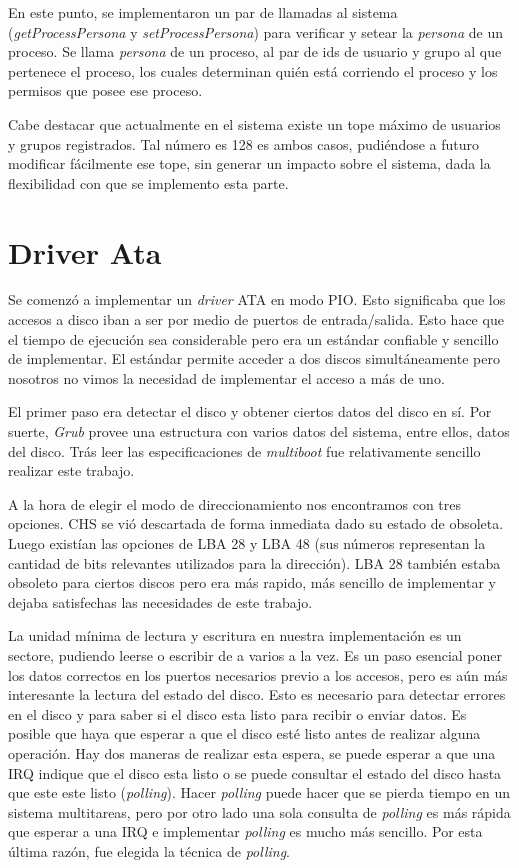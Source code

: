 \documentclass[a4paper,10pt]{article}
\begin{document}
En este punto, se implementaron un par de llamadas al sistema (\textit{getProcessPersona} y \textit{setProcessPersona}) para verificar y setear la \textit{persona}
de un proceso. Se llama \textit{persona} de un proceso, al par de ids de usuario y grupo al que pertenece el proceso, los cuales determinan quién está corriendo
el proceso y los permisos que posee ese proceso.

Cabe destacar que actualmente en el sistema existe un tope máximo de usuarios y grupos registrados. Tal número es 128 es ambos casos, pudiéndose a futuro modificar
fácilmente ese tope, sin generar un impacto sobre el sistema, dada la flexibilidad con que se implemento esta parte.

\newpage
\section{Driver Ata}
    Se comenzó a implementar un \textit{driver} ATA en modo PIO. Esto significaba que los accesos a disco iban a ser
    por medio de puertos de entrada/salida. Esto hace que el tiempo de ejecución sea considerable pero era un estándar
    confiable y sencillo de implementar.
    El estándar permite acceder a dos discos simultáneamente pero nosotros no vimos la necesidad de implementar el 
    acceso a más de uno.
    
    El primer paso era detectar el disco y obtener ciertos datos del disco en sí. Por suerte, \textit{Grub} provee una estructura
    con varios datos del sistema, entre ellos, datos del disco. Trás leer las especificaciones de \textit{multiboot}
    fue relativamente sencillo realizar este trabajo.

    A la hora de elegir el modo de direccionamiento nos encontramos con tres opciones. CHS se vió descartada de forma
    inmediata dado su estado de obsoleta. Luego existían las opciones de LBA 28 y LBA 48 (sus números representan
    la cantidad de bits relevantes utilizados para la dirección). LBA 28 también estaba obsoleto para ciertos discos
    pero era más rapido, más sencillo de implementar y dejaba satisfechas las necesidades de este trabajo.

    La unidad mínima de lectura y escritura en nuestra implementación es un sectore, pudiendo leerse o escribir de a
    varios a la vez. Es un paso esencial poner los datos correctos en los puertos necesarios previo a los accesos, pero
    es aún más interesante la lectura del estado del disco. Esto es necesario para detectar errores en el disco
    y para saber si el disco esta listo para recibir o enviar datos. Es posible que haya que esperar a que el disco
    esté listo antes de realizar alguna operación. Hay dos maneras de realizar esta espera, se puede esperar a que una IRQ
    indique que el disco esta listo o se puede consultar el estado del disco hasta que este este listo (\textit{polling}).
    Hacer \textit{polling} puede hacer que se pierda tiempo en un sistema multitareas, pero por otro lado una sola
    consulta de \textit{polling} es más rápida que esperar a una IRQ e implementar \textit{polling} es mucho más sencillo.
    Por esta última razón, fue elegida la técnica de \textit{polling}.
\end{document}
